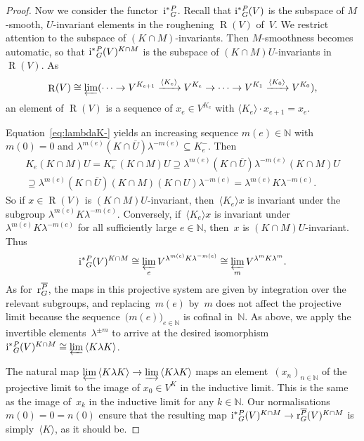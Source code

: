 \documentclass{amsart}
\theoremstyle{remark}
\theoremstyle{definition}
\DeclareMathOperator{\Rough}{R}%
\newcommand*{\Jact}{\textup i^*{}}%
\newcommand*{\Jacr}{\textup r}%
\newcommand*{\nb}{\nobreakdash}%
\newcommand*{\idem}[1]{\langle#1\rangle}%
\newcommand*{\opp}[1]{\overline{#1}}%
\newcommand*{\N}{\mathbb N}%
\begin{document}
\begin{proof}
  Now we consider the functor~\(\Jact_G^P\).  Recall that \(\Jact_G^P(V)\) is the subspace of \(M\)\nb-smooth, \(U\)\nb-invariant elements in the roughening \(\Rough (V)\) of~\(V\).  We restrict attention to the subspace of \((K \cap M)\)-invariants.  Then \(M\)\nb-smoothness becomes automatic, so that \(\Jact_G^P(V)^{K \cap M}\) is the subspace of \((K \cap M) U\)\nb-invariants in \(\Rough(V)\).  As
  \[
  \Rough(V) \cong \varprojlim ( \dotsb\to V^{K_{e+1}} \xrightarrow{\idem{K_e}}
  V^{K_e} \to \dotsb \to V^{K_1} \xrightarrow{\idem{K_0}} V^{K_0} ),
  \]
  an element of \(\Rough(V)\) is a sequence of \(x_e \in V^{K_e}\) with \(\idem{K_e}\cdot x_{e+1} = x_e\).

  Equation~\eqref{eq:lambdaK-} yields an increasing sequence \(m(e) \in \N\) with \(m(0)=0\) and \(\lambda^{m(e)} (K \cap \opp{U}) \lambda^{-m(e)} \subseteq K_e^-\).  Then
  \begin{multline*}
    K_e (K \cap M) U
    = K_e^- (K \cap M) U
    \supseteq \lambda^{m(e)} (K \cap \opp{U}) \lambda^{-m(e)}
    (K \cap M) U
    \\\supseteq \lambda^{m(e)} (K \cap \opp{U}) (K \cap M)
    (K \cap U) \lambda^{-m(e)}
    = \lambda^{m(e)} K \lambda^{-m(e)}.
  \end{multline*}
  So if \(x\in\Rough(V)\) is \((K \cap M) U\)\nb-invariant, then~\(\idem{K_e}x\) is invariant under the subgroup \(\lambda^{m(e)} K \lambda^{-m(e)}\).  Conversely, if~\(\idem{K_e}x\) is invariant under \(\lambda^{m(e)} K \lambda^{-m(e)}\) for all sufficiently large \(e\in\N\), then~\(x\) is \((K \cap M) U\)\nb-invariant.  Thus
  \[
  \Jact_G^P(V)^{K \cap M}
  \cong \varprojlim_e V^{\lambda^{m(e)} K \lambda^{-m(e)}}
  \cong \varprojlim_m V^{\lambda^m K \lambda^m}.
  \]
  As for~\(\Jacr_G^{\opp{P}}\), the maps in this projective system are given by integration over the relevant subgroups, and replacing~\(m(e)\) by~\(m\) does not affect the projective limit because the sequence~\(\bigl(m(e)\bigr)_{e\in\N}\) is cofinal in~\(\N\).  As above, we apply the invertible elements~\(\lambda^{\pm m}\) to arrive at the desired isomorphism \(\Jact_G^P (V)^{K \cap M} \cong \varprojlim {}\idem{K \lambda K}\).

  The natural map \(\varprojlim {}\idem{K\lambda K}\to \varinjlim {}\idem{K\lambda K}\) maps an element~\((x_n)_{n\in\N}\) of the projective limit to the image of \(x_0 \in V^K\) in the inductive limit.  This is the same as the image of~\(x_k\) in the inductive limit for any \(k\in\N\).  Our normalisations \(m(0)=0=n(0)\) ensure that the resulting map \(\Jact_G^P(V)^{K\cap M}\to \Jacr_G^{\opp{P}}(V)^{K\cap M}\) is simply~\(\idem{K}\), as it should be.
\end{proof}
\end{document}
